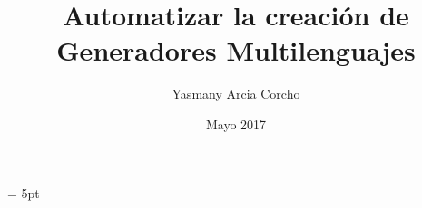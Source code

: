 \documentclass[11pt,twoside]{uhthesis}
\title{Automatizar la creación de Generadores Multilenguajes}
\author{Yasmany Arcia Corcho}
\date{Mayo 2017}
\begin{document}
\frontmatter
\maketitle
\parskip = 5pt







\mainmatter

 
 
 
 

\backmatter


%
\end{document}
